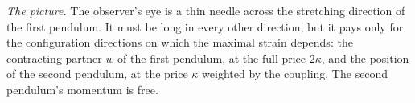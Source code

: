 \emph{The picture.} The observer's eye is a thin needle across the stretching direction of the first pendulum. It must be long in every other direction, but it pays only for the configuration directions on which the maximal strain depends: the contracting partner $w$ of the first pendulum, at the full price $2\kappa$, and the position of the second pendulum, at the price $\kappa$ weighted by the coupling. The second pendulum's momentum is free.
